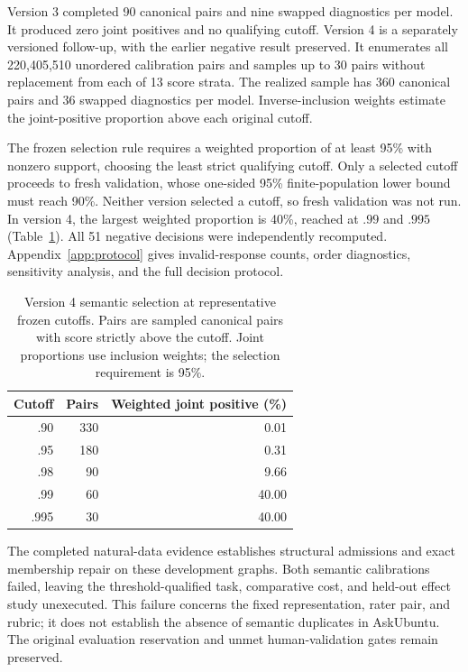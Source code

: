 Version 3 completed 90 canonical pairs and nine swapped diagnostics per
model. It produced zero joint positives and no qualifying cutoff.
Version 4 is a separately versioned follow-up, with the earlier negative
result preserved. It enumerates all 220,405,510 unordered calibration
pairs and samples up to 30 pairs without replacement from each of 13
score strata. The realized sample has 360 canonical pairs and 36 swapped
diagnostics per model. Inverse-inclusion weights estimate the joint-positive
proportion above each original cutoff.

The frozen selection rule requires a weighted proportion of at least
95\% with nonzero support, choosing the least strict qualifying cutoff.
Only a selected cutoff proceeds to fresh validation, whose one-sided
95\% finite-population lower bound must reach 90\%. Neither version
selected a cutoff, so fresh validation was not run. In version 4, the
largest weighted proportion is 40\%, reached at $.99$ and $.995$
(Table~\ref{tab:calibration}). All 51 negative decisions were independently
recomputed. Appendix~\ref{app:protocol} gives invalid-response counts,
order diagnostics, sensitivity analysis, and the full decision protocol.

\begin{table}[t]
\centering
\small
\caption{Version 4 semantic selection at representative frozen cutoffs.
Pairs are sampled canonical pairs with score strictly above the cutoff.
Joint proportions use inclusion weights; the selection requirement is 95\%.}
\label{tab:calibration}
\begin{tabular}{rrr}
\hline
Cutoff & Pairs & Weighted joint positive (\%)\\
\hline
.90 & 330 & 0.01\\
.95 & 180 & 0.31\\
.98 & 90 & 9.66\\
.99 & 60 & 40.00\\
.995 & 30 & 40.00\\
\hline
\end{tabular}
\end{table}

The completed natural-data evidence establishes structural admissions and
exact membership repair on these development graphs. Both semantic
calibrations failed, leaving the threshold-qualified task, comparative
cost, and held-out effect study unexecuted. This failure concerns the fixed
representation, rater pair, and rubric; it does not establish the absence
of semantic duplicates in AskUbuntu. The original evaluation reservation
and unmet human-validation gates remain preserved.

